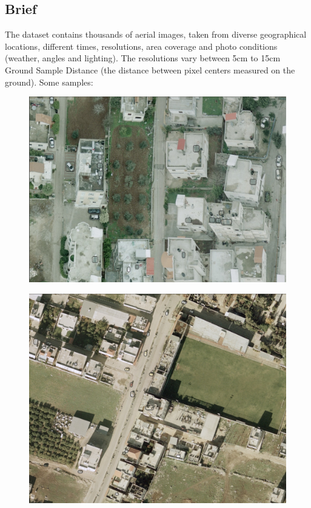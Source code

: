 \documentclass[]{article}
\begin{document}
\subsection{Brief}
The dataset contains thousands of aerial images, taken from diverse geographical locations, different times, resolutions, area coverage and photo conditions (weather, angles and lighting). The resolutions vary between 5cm to 15cm Ground Sample Distance (the distance between pixel centers measured on the ground). Some samples:\\
\begin{figure}[!h]
\centering
\includegraphics[width=1\linewidth]{"images/im1"}
\end{figure}
\begin{figure}[!h]
\centering
\includegraphics[width=1\linewidth]{"images/im2"}
\end{figure}
\end{document}
